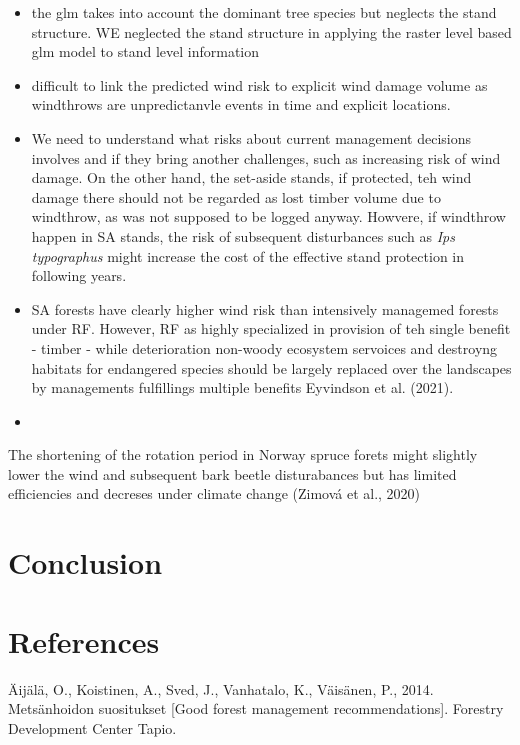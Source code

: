 \documentclass[]{elsarticle} %
\begin{document}
\begin{itemize}
\item
  the glm takes into account the dominant tree species but neglects the stand structure. WE neglected the stand structure in applying the raster level based glm model to stand level information
\item
  difficult to link the predicted wind risk to explicit wind damage volume as windthrows are unpredictanvle events in time and explicit locations.
\item
  We need to understand what risks about current management decisions involves and if they bring another challenges, such as increasing risk of wind damage. On the other hand, the set-aside stands, if protected, teh wind damage there should not be regarded as lost timber volume due to windthrow, as was not supposed to be logged anyway. Howvere, if windthrow happen in SA stands, the risk of subsequent disturbances such as \emph{Ips typographus} might increase the cost of the effective stand protection in following years.
\item
  SA forests have clearly higher wind risk than intensively managemed forests under RF. However, RF as highly specialized in provision of teh single benefit - timber - while deterioration non-woody ecosystem servoices and destroyng habitats for endangered species should be largely replaced over the landscapes by managements fulfillings multiple benefits Eyvindson et al. (2021).
\item
\end{itemize}

The shortening of the rotation period in Norway spruce forets might slightly lower the wind and subsequent bark beetle disturabances but has limited efficiencies and decreses under climate change (Zimová et al., 2020)

\hypertarget{conclusion}{%
\section{Conclusion}\label{conclusion}}

\newpage

\hypertarget{references}{%
\section*{References}\label{references}}

\hypertarget{refs}{}
\leavevmode\hypertarget{ref-Aijala2014a}{}%
Äijälä, O., Koistinen, A., Sved, J., Vanhatalo, K., Väisänen, P., 2014. Metsänhoidon suositukset {[}Good forest management recommendations{]}. Forestry Development Center Tapio.
\end{document}
